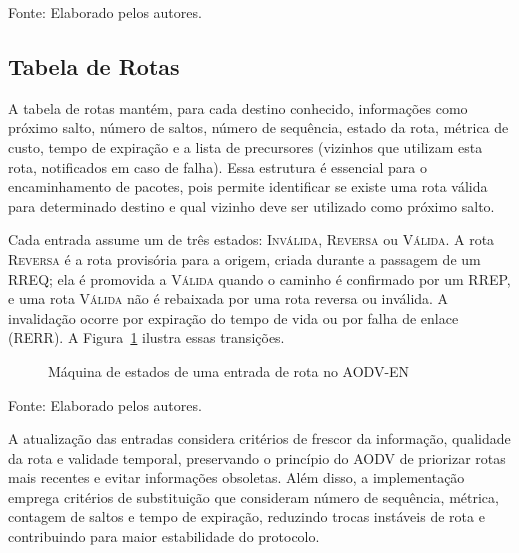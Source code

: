 Fonte: Elaborado pelos autores.

\subsection{Tabela de Rotas}\label{tabela-de-rotas}

A tabela de rotas mantém, para cada destino conhecido, informações como
próximo salto, número de saltos, número de sequência, estado da rota,
métrica de custo, tempo de expiração e a lista de precursores (vizinhos
que utilizam esta rota, notificados em caso de falha). Essa estrutura é
essencial para o encaminhamento de pacotes, pois permite identificar se
existe uma rota válida para determinado destino e qual vizinho deve ser
utilizado como próximo salto.

Cada entrada assume um de três estados: \textsc{Inválida}, \textsc{Reversa}
ou \textsc{Válida}. A rota \textsc{Reversa} é a rota provisória para a
origem, criada durante a passagem de um RREQ; ela é promovida a
\textsc{Válida} quando o caminho é confirmado por um RREP, e uma rota
\textsc{Válida} não é rebaixada por uma rota reversa ou inválida. A
invalidação ocorre por expiração do tempo de vida ou por falha de enlace
(RERR). A Figura~\ref{fig:estados-rota} ilustra essas transições.

\begin{figure}[H]
\centering
{}
\caption{Máquina de estados de uma entrada de rota no AODV-EN}\label{fig:estados-rota}
\end{figure}

Fonte: Elaborado pelos autores.

A atualização das entradas considera critérios de frescor da informação,
qualidade da rota e validade temporal, preservando o princípio do AODV
de priorizar rotas mais recentes e evitar informações obsoletas. Além
disso, a implementação emprega critérios de substituição que consideram
número de sequência, métrica, contagem de saltos e tempo de expiração,
reduzindo trocas instáveis de rota e contribuindo para maior
estabilidade do protocolo.


